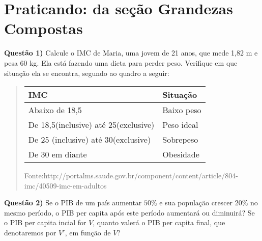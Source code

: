 \section{Praticando: da seção Grandezas Compostas}
\label{\detokenize{NO103-A:praticando-da-secao-grandezas-compostas}}
\textbf{Questão 1)}  Calcule o IMC de Maria, uma jovem de 21 anos,  que mede 1,82 m e pesa 60 kg.  Ela  está  fazendo uma dieta para perder peso. Verifique em que situação ela se encontra, segundo ao quadro a seguir:
\begin{quote}


\begin{savenotes}\sphinxattablestart
\centering
\begin{tabulary}{\linewidth}[t]{|T|T|}
\hline

IMC
&
Situação
\\
\hline
Abaixo de 18,5
&
Baixo peso
\\
\hline
De 18,5(inclusive) até
25(exclusive)
&
Peso ideal
\\
\hline
De 25 (inclusive) até
30(exclusive)
&
Sobrepeso
\\
\hline
De 30 em diante
&
Obesidade
\\
\hline
\end{tabulary}
\par
\sphinxattableend\end{savenotes}

Fonte:http://portalms.saude.gov.br/component/content/article/804-imc/40509-imc-em-adultos
\end{quote}

\textbf{Questão 2)} Se o PIB de um país aumentar \(50\%\) e sua população crescer \(20\%\) no mesmo período, o PIB per capita após este período aumentará ou diminuirá? Se o PIB per capita incial for \(V\),  quanto valerá o PIB per capita final, que denotaremos por \(V'\), em função de \(V\)?

